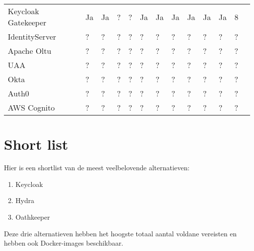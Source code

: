 \begin{table}[htbp]
\begin{adjustbox}{width=1\textwidth}
\begin{tabular}{@{}lllllllllllll@{}}
    Keycloak Gatekeeper & Ja       & Ja        & ?                   & ?               & Ja               & Ja             & Ja         & Ja         & Ja             & Ja          & 8      \\
    IdentityServer & ?             & ?         & ?                   & ?               & ?                & ?              & ?          & ?          & ?              & ?           & ?      \\
    Apache Oltu   & ?             & ?         & ?                   & ?               & ?                & ?              & ?          & ?          & ?              & ?           & ?      \\
    UAA           & ?             & ?         & ?                   & ?               & ?                & ?              & ?          & ?          & ?              & ?           & ?      \\
    Okta          & ?             & ?         & ?                   & ?               & ?                & ?              & ?          & ?          & ?              & ?           & ?      \\
    Auth0         & ?             & ?         & ?                   & ?               & ?                & ?              & ?          & ?          & ?              & ?           & ?      \\
    AWS Cognito   & ?             & ?         & ?                   & ?               & ?                & ?              & ?          & ?          & ?              & ?           & ?      \\
    \bottomrule
  \end{tabular}
  \end{adjustbox}
\end{table}


\section{Short list}%
\label{subsec:short-list}
Hier is een shortlist van de meest veelbelovende alternatieven:
\begin{enumerate}
    \item Keycloak
    \item Hydra
    \item Oathkeeper
\end{enumerate}

Deze drie alternatieven hebben het hoogste totaal aantal voldane vereisten en hebben ook Docker-images beschikbaar.

